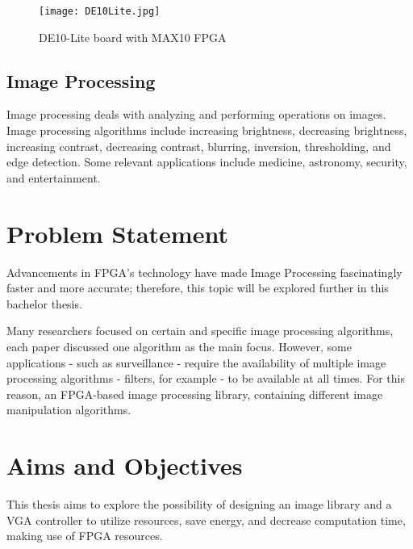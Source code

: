 \begin{figure}[H]
    \centering
    \texttt{[image: DE10Lite.jpg]}
    \caption{DE10-Lite board with MAX10 FPGA \cite{figfour}}
    \label{fig:DE10}   
\end{figure}

\subsection{Image Processing}
\par Image processing deals with analyzing and performing operations on images. Image processing algorithms include increasing brightness, decreasing brightness, increasing contrast, decreasing contrast, blurring, inversion, thresholding, and edge detection. Some relevant applications include medicine, astronomy, security, and entertainment. \newline

\section{Problem Statement}

\par Advancements in FPGA's technology have made Image Processing fascinatingly faster and more accurate; therefore, this topic will be explored further in this bachelor thesis. \newline 

\par Many researchers focused on certain and specific image processing algorithms, each paper discussed one algorithm as the main focus. However, some applications - such as surveillance - require the availability of multiple image processing algorithms - filters, for example - to be available at all times. For this reason, an FPGA-based image processing library, containing different image manipulation algorithms.\newline

\section{Aims and Objectives}

\par This thesis aims to explore the possibility of designing an image library and a VGA controller to utilize resources, save energy, and decrease computation time, making use of FPGA resources.  \newline

